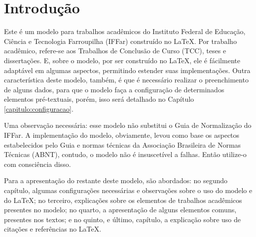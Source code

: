 \chapter{Introdução}
Este é um modelo para trabalhos acadêmicos do Instituto Federal de Educação, Ciência e Tecnologia Farroupilha (IFFar) construído no \LaTeX{}. Por trabalho acadêmico, refere-se aos Trabalhos de Conclusão de Curso (TCC), teses e dissertações. E, sobre o modelo, por ser construído no \LaTeX{}, ele é fácilmente adaptável em algumas aspectos, permitindo estender suas implementações. Outra característica deste modelo, também, é que é necessário realizar o preenchimento de alguns dados, para que o modelo faça a configuração de determinados elementos pré-textuais, porém, isso será detalhado no Capítulo \ref{capitulo:configuracao}.

Uma observação necessária: esse modelo não substitui o Guia de Normalização do IFFar. A implementação do modelo, obviamente, levou como base os aspectos estabelecidos pelo Guia e normas técnicas da Associação Brasileira de Normas Técnicas (ABNT), contudo, o modelo não é insuscetível a falhas. Então utilize-o com consciência disso.

Para a apresentação do restante deste modelo, são abordados: no segundo capítulo, algumas configurações necessárias e observações sobre o uso do modelo e do \LaTeX{}; no terceiro, explicações sobre os elementos de trabalhos acadêmicos presentes no modelo; no quarto, a apresentação de alguns elementos comuns, presentes nos textos; e no quinto, e último, capítulo, a explicação sobre uso de citações e referências no \LaTeX{}.